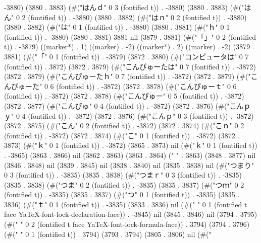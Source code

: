 -3880) (3880 . 3883) (#("はんｄ" 0 3 (fontified t)) . -3880) (3880 . 3883) (#("はん" 0 2 (fontified t)) . -3880) (3880 . 3882) (#("はｎ" 0 2 (fontified t)) . -3880) (3880 . 3882) (#("は" 0 1 (fontified t)) . -3880) (3880 . 3881) (#("ｈ" 0 1 (fontified t)) . -3880) (3880 . 3881) 3881 nil (3879 . 3881) (#("「」" 0 2 (fontified t)) . -3879) ((marker*) . 1) ((marker) . -2) ((marker*) . 2) ((marker) . -2) (3879 . 3881) (#("「" 0 1 (fontified t)) . -3879) (3872 . 3880) (#("コンピュータは" 0 7 (fontified t)) . 3872) (3872 . 3879) (#("こんぴゅーたは" 0 7 (fontified t)) . -3872) (3872 . 3879) (#("こんぴゅーたｈ" 0 7 (fontified t)) . -3872) (3872 . 3879) (#("こんぴゅーた" 0 6 (fontified t)) . -3872) (3872 . 3878) (#("こんぴゅーｔ" 0 6 (fontified t)) . -3872) (3872 . 3878) (#("こんぴゅー" 0 5 (fontified t)) . -3872) (3872 . 3877) (#("こんぴゅ" 0 4 (fontified t)) . -3872) (3872 . 3876) (#("こんｐｙ" 0 4 (fontified t)) . -3872) (3872 . 3876) (#("こんｐ" 0 3 (fontified t)) . -3872) (3872 . 3875) (#("こん" 0 2 (fontified t)) . -3872) (3872 . 3874) (#("こｎ" 0 2 (fontified t)) . -3872) (3872 . 3874) (#("こ" 0 1 (fontified t)) . -3872) (3872 . 3873) (#("ｋ" 0 1 (fontified t)) . -3872) (3865 . 3873) nil (#("ｋ" 0 1 (fontified t)) . -3865) (3863 . 3866) nil (3862 . 3863) (3863 . 3864) ("  " . 3863) (3848 . 3877) nil (3846 . 3848) nil (3839 . 3845) nil (3838 . 3840) nil (3835 . 3838) nil (#("つまり" 0 3 (fontified t)) . -3835) (3835 . 3838) (#("つまｒ" 0 3 (fontified t)) . -3835) (3835 . 3838) (#("つま" 0 2 (fontified t)) . -3835) (3835 . 3837) (#("つｍ" 0 2 (fontified t)) . -3835) (3835 . 3837) (#("つ" 0 1 (fontified t)) . -3835) (3835 . 3836) (#("ｔ" 0 1 (fontified t)) . -3835) (3833 . 3836) nil (#("
" 0 1 (fontified t face YaTeX-font-lock-declaration-face)) . -3845) nil (3845 . 3846) nil (3794 . 3795) (#("  " 0 2 (fontified t face YaTeX-font-lock-formula-face)) . 3794) (3794 . 3796) (#(" " 0 1 (fontified t)) . 3794) (3793 . 3794) (3805 . 3806) nil (#("

